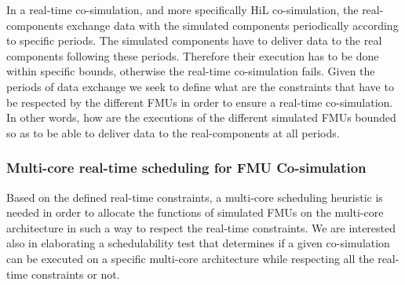 In a real-time co-simulation, and more specifically HiL co-simulation, the real-components exchange data with the simulated components periodically according to specific periods. The simulated components have to deliver data to the real components following these periods. Therefore their execution has to be done within specific bounds, otherwise the real-time co-simulation fails. Given the periods of data exchange we seek to define what are the constraints that have to be respected by the different FMUs in order to ensure a real-time co-simulation. In other words, how are the executions of the different simulated FMUs bounded so as to be able to deliver data to the real-components at all periods.

\subsubsection{Multi-core real-time scheduling for FMU Co-simulation}

Based on the defined real-time constraints, a multi-core scheduling heuristic is needed in order to allocate the functions of simulated FMUs on the multi-core architecture in such a way to respect the real-time constraints. We are interested also in elaborating a schedulability test that determines if a given co-simulation can be executed on a specific multi-core architecture while respecting all the real-time constraints or not.  